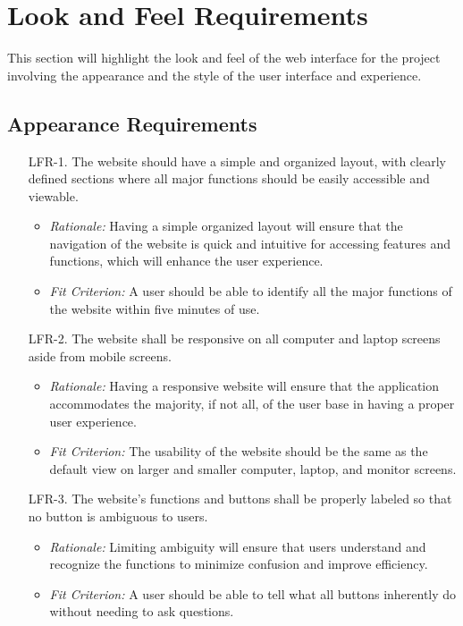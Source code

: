 \documentclass[12pt]{article}
\begin{document}
\section{Look and Feel Requirements}
This section will highlight the look and feel of the web interface for the
project involving the appearance and the style of the user interface and
experience.
\subsection{Appearance Requirements}
\begin{enumerate}
  \item[LFR-1.] The website should have a simple and organized layout, with
  clearly defined sections where all major functions should be easily accessible
  and viewable.
  \begin{itemize}
    \item \textit{Rationale:} Having a simple organized layout will ensure that the
    navigation of the website is quick and intuitive for accessing features and
    functions, which will enhance the user experience.
    \item \textit{Fit Criterion:} A user should be able to identify all the major
    functions of the website within five minutes of use.
  \end{itemize}
  
  \item[LFR-2.] The website shall be responsive on all computer and laptop screens
  aside from mobile screens.
  \begin{itemize}
    \item \textit{Rationale:} Having a responsive website will ensure that the
    application accommodates the majority, if not all, of the user base in having a
    proper user experience. 
    \item \textit{Fit Criterion:} The usability of the website should be the same
    as the default view on larger and smaller computer, laptop, and monitor screens.
  \end{itemize}
  
  \item[LFR-3.] The website's functions and buttons shall be properly labeled
  so that no button is ambiguous to users.
  \begin{itemize}
    \item \textit{Rationale:} Limiting ambiguity will ensure that users
    understand and recognize the functions to minimize confusion and improve
    efficiency.
    \item \textit{Fit Criterion:} A user should be able to tell what all buttons
    inherently do without needing to ask questions.
  \end{itemize}
  

\end{enumerate}
\end{document}
